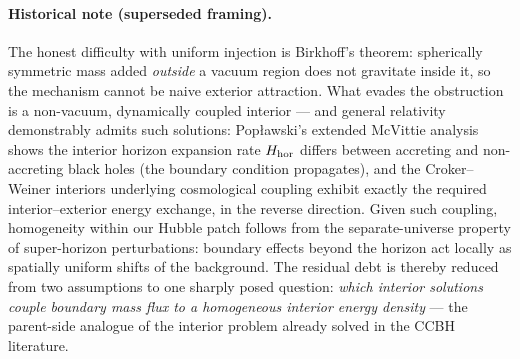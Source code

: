 \documentclass[11pt]{article}
\begin{document}
\paragraph{Historical note (superseded framing).} The honest difficulty with uniform injection is Birkhoff's theorem: spherically symmetric mass added \emph{outside} a vacuum region does not gravitate inside it, so the mechanism cannot be naive exterior attraction. What evades the obstruction is a non-vacuum, dynamically coupled interior --- and general relativity demonstrably admits such solutions: Popławski's extended McVittie analysis shows the interior horizon expansion rate $H_{\rm hor}$ differs between accreting and non-accreting black holes \cite{Poplawski2024} (the boundary condition propagates), and the Croker--Weiner interiors underlying cosmological coupling \cite{CrokerWeiner2019} exhibit exactly the required interior--exterior energy exchange, in the reverse direction. Given such coupling, homogeneity within our Hubble patch follows from the separate-universe property of super-horizon perturbations: boundary effects beyond the horizon act locally as spatially uniform shifts of the background. The residual debt is thereby reduced from two assumptions to one sharply posed question: \emph{which interior solutions couple boundary mass flux to a homogeneous interior energy density} --- the parent-side analogue of the interior problem already solved in the CCBH literature.
\end{document}
